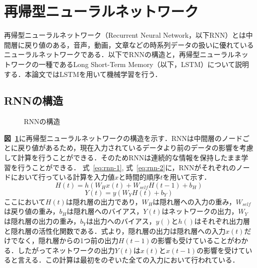 \section{再帰型ニューラルネットワーク}
再帰型ニューラルネットワーク（Recurrent Neural Network，以下RNN）とは中間層に戻り値のある，音声，動画，文章などの時系列データの扱いに優れているニューラルネットワークである．以下でRNNの構造と，再帰型ニューラルネットワークの一種であるLong Short-Term Memory（以下，LSTM）について説明する．本論文ではLSTMを用いて機械学習を行う．
\subsection{RNNの構造}
\label{ssec:rel_2}

\begin{figure}[tb]
 \begin{center}
  \caption{RNNの構造}
  \label{rnn}
\end{center}
\end{figure}

\textbf{図~\ref{rnn}}に再帰型ニューラルネットワークの構造を示す．RNNは中間層のノードごとに戻り値があるため，現在入力されているデータより前のデータの影響を考慮して計算を行うことができる．そのためRNNは連続的な情報を保持したまま学習を行うことができる\cite{chakra16:bangla}．
式~\ref{eq:rnn-1}, 式~\ref{eq:rnn-2}に，RNNがそれぞれのノードにおいて行っている計算を入力値$x$と時間的順序$t$を用いて示す．
\begin{equation}
 H(t) = h(W_Hx(t) + W_{self}H(t-1) + b_H)
  \label{eq:rnn-1}
\end{equation}
\begin{equation}
 Y(t) = y(W_YH(t) + b_Y)
  \label{eq:rnn-2}
\end{equation}
ここにおいて$H(t)$は隠れ層の出力であり，$W_H$は隠れ層への入力の重み，$W_{self}$は戻り値の重み，$b_H$は隠れ層へのバイアス，$Y(t)$はネットワークの出力，$W_Y$は隠れ層の出力の重み，$b_Y$は出力へのバイアス，$y()$と$h()$はそれぞれ出力層と隠れ層の活性化関数である．式より，隠れ層の出力は隠れ層への入力$x(t)$だけでなく，隠れ層からの1つ前の出力$H(t-1)$の影響も受けていることがわかる．したがってネットワークの出力$Y(t)$は$x(t)$と$x(t-1)$の影響を受けていると言える．この計算は最初をのぞいた全ての入力において行われている．

